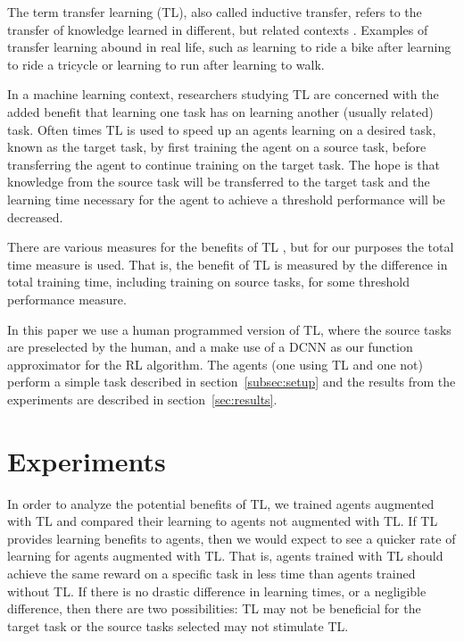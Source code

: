 \documentclass{llncs}
\begin{document}
The term transfer learning (TL), also called inductive transfer, refers to the transfer of knowledge learned in different, but related contexts \citep{ramon2007transfer}.
Examples of transfer learning abound in real life, such as learning to ride a bike after learning to ride a tricycle or learning to run after learning to walk. 

In a machine learning context, researchers studying TL are concerned with the added benefit that learning one task has on learning another (usually related) task.
Often times TL is used to speed up an agents learning on a desired task, known as the target task, by first training the agent on a source task, before transferring the agent to continue training on the target task. 
The hope is that knowledge from the source task will be transferred to the target task and the learning time necessary for the agent to achieve a threshold performance will be decreased. 

There are various measures for the benefits of TL \citep{taylor2009transfer}, but for our purposes the total time measure is used.
That is, the benefit of TL is measured by the difference in total training time, including training on source tasks, for some threshold performance measure. 

In this paper we use a human programmed version of TL, where the source tasks are preselected by the human, and a make use of a DCNN as our function approximator for the RL algorithm.
The agents (one using TL and one not) perform a simple task described in section~\ref{subsec:setup} and the results from the experiments are described in section~\ref{sec:results}.


\section{Experiments}\label{sec:experiments}


In order to analyze the potential benefits of TL, we trained agents augmented with TL and compared their learning to agents not augmented with TL. 
If TL provides learning benefits to agents, then we would expect to see a quicker rate of learning for agents augmented with TL.
That is, agents trained with TL should achieve the same reward on a specific task in less time than agents trained without TL. 
If there is no drastic difference in learning times, or a negligible difference, then there are two possibilities: TL may not be beneficial for the target task or the source tasks selected may not stimulate TL. 
\end{document}
